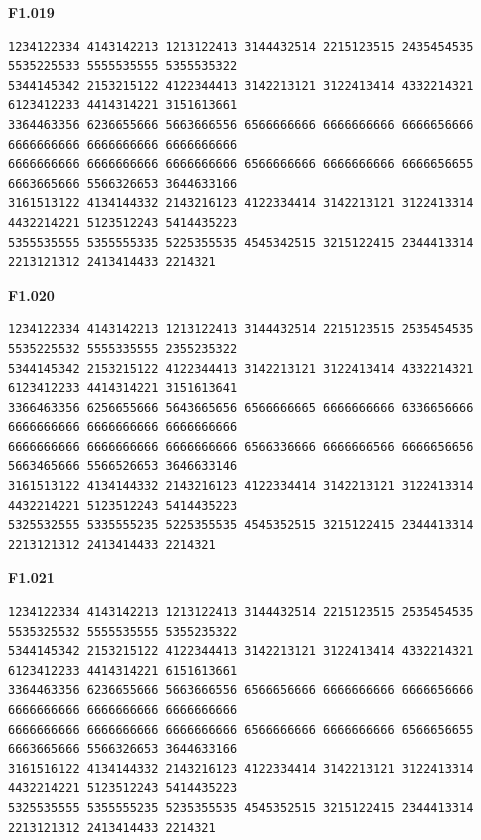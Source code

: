 \noindent\begin{minipage}{\linewidth}\textbf{F1.019}
\begin{lstlisting}
1234122334 4143142213 1213122413 3144432514 2215123515 2435454535 5535225533 5555535555 5355535322
5344145342 2153215122 4122344413 3142213121 3122413414 4332214321 6123412233 4414314221 3151613661
3364463356 6236655666 5663666556 6566666666 6666666666 6666656666 6666666666 6666666666 6666666666
6666666666 6666666666 6666666666 6566666666 6666666666 6666656655 6663665666 5566326653 3644633166
3161513122 4134144332 2143216123 4122334414 3142213121 3122413314 4432214221 5123512243 5414435223
5355535555 5355555335 5225355535 4545342515 3215122415 2344413314 2213121312 2413414433 2214321
\end{lstlisting}
\end{minipage}\par\smallskip

\noindent\begin{minipage}{\linewidth}\textbf{F1.020}
\begin{lstlisting}
1234122334 4143142213 1213122413 3144432514 2215123515 2535454535 5535225532 5555335555 2355235322
5344145342 2153215122 4122344413 3142213121 3122413414 4332214321 6123412233 4414314221 3151613641
3366463356 6256655666 5643665656 6566666665 6666666666 6336656666 6666666666 6666666666 6666666666
6666666666 6666666666 6666666666 6566336666 6666666566 6666656656 5663465666 5566526653 3646633146
3161513122 4134144332 2143216123 4122334414 3142213121 3122413314 4432214221 5123512243 5414435223
5325532555 5335555235 5225355535 4545352515 3215122415 2344413314 2213121312 2413414433 2214321
\end{lstlisting}
\end{minipage}\par\smallskip

\noindent\begin{minipage}{\linewidth}\textbf{F1.021}
\begin{lstlisting}
1234122334 4143142213 1213122413 3144432514 2215123515 2535454535 5535325532 5555535555 5355235322
5344145342 2153215122 4122344413 3142213121 3122413414 4332214321 6123412233 4414314221 6151613661
3364463356 6236655666 5663666556 6566656666 6666666666 6666656666 6666666666 6666666666 6666666666
6666666666 6666666666 6666666666 6566666666 6666666666 6566656655 6663665666 5566326653 3644633166
3161516122 4134144332 2143216123 4122334414 3142213121 3122413314 4432214221 5123512243 5414435223
5325535555 5355555235 5235355535 4545352515 3215122415 2344413314 2213121312 2413414433 2214321
\end{lstlisting}
\end{minipage}\par\smallskip

